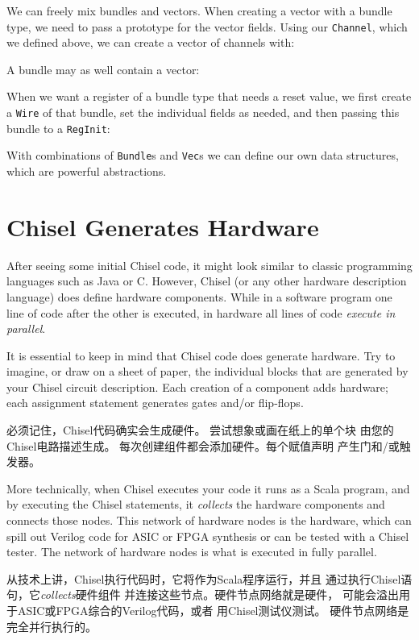 \documentclass[%
    10pt,
    headinclude, footexclude,
    openright, %
    notitlepage,
    cleardoubleempty,
    headsepline,
    pointlessnumbers,
    bibtotoc, idxtotoc,
    ]{scrbook}
\newcommand{\code}[1]{{\small{\texttt{#1}}}}
\begin{document}
We can freely mix bundles and vectors. When creating a vector with a bundle
type, we need to pass a prototype for the vector fields. Using our
\code{Channel}, which we defined above, we can create a vector of channels with:


\noindent A bundle may as well contain a vector:


When we want a register of a bundle type that needs a reset value,
we first create a \code{Wire} of that bundle, set the individual fields
as needed, and then passing this bundle to a \code{RegInit}:


With combinations of \code{Bundle}s and \code{Vec}s we can define our own data
structures, which are powerful abstractions.

\section{Chisel Generates Hardware}

After seeing some initial Chisel code, it might look similar to classic programming
languages such as Java or C. However, Chisel (or any other hardware description
language) does define hardware components. While in a software program one
line of code after the other is executed, in hardware all lines of code
\emph{execute in parallel}.

It is essential to keep in mind that Chisel code does generate hardware.
Try to imagine, or draw on a sheet of paper, the individual blocks that
are generated by your Chisel circuit description.
Each creation of a component adds hardware; each assignment statement
generates gates and/or flip-flops.

必须记住，Chisel代码确实会生成硬件。
尝试想象或画在纸上的单个块
由您的Chisel电路描述生成。
每次创建组件都会添加硬件。每个赋值声明
产生门和/或触发器。

More technically, when Chisel executes your code it runs as a Scala program, and
by executing the Chisel statements, it \emph{collects} the hardware components
and connects those nodes. This network of hardware nodes is the hardware,
which can spill out Verilog code for ASIC or FPGA synthesis or can be
tested with a Chisel tester.
The network of hardware nodes is what is executed in fully parallel.


从技术上讲，Chisel执行代码时，它将作为Scala程序运行，并且
通过执行Chisel语句，它\emph{collects}硬件组件
并连接这些节点。硬件节点网络就是硬件，
可能会溢出用于ASIC或FPGA综合的Verilog代码，或者
用Chisel测试仪测试。
硬件节点网络是完全并行执行的。
\end{document}
